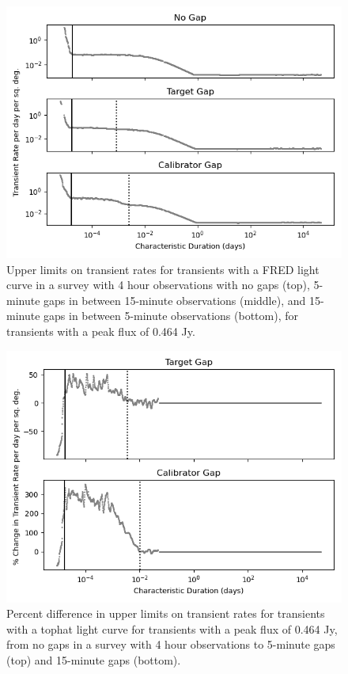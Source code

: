 \documentclass[12pt]{article}
\begin{document}
 \begin{figure}
\includegraphics[width=0.75\columnwidth]{figure6.png}
\caption{Upper limits on transient rates for transients with a FRED light curve in a survey with 4 hour observations with no gaps (top), 5-minute gaps in between 15-minute observations (middle), and 15-minute gaps in between 5-minute observations (bottom), for transients with a peak flux of 0.464 Jy.}
\label{fig6}
 \end{figure}
 
 \begin{figure}
\includegraphics[width=0.75\columnwidth]{figure7.png}
\caption{Percent difference in upper limits on transient rates for transients with a tophat light curve for transients with a peak flux of 0.464 Jy, from no gaps in a survey with 4 hour observations to 5-minute gaps (top) and 15-minute gaps (bottom).}
\label{fig7}
 \end{figure}
 
\end{document}
